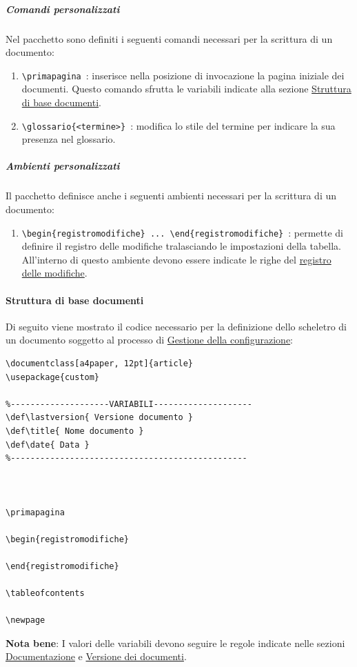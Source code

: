\subparagraph{Comandi personalizzati}
Nel pacchetto sono definiti i seguenti comandi necessari per la scrittura di un documento:
\begin{enumerate}
    \item \lstinline|\primapagina|\ : inserisce nella posizione di invocazione la pagina iniziale dei documenti.
    Questo comando sfrutta le variabili indicate alla sezione \hyperref[par:struttura_di_base_documenti]{Struttura di base documenti}.
    \item \lstinline|\glossario{<termine>}|\ : modifica lo stile del termine per indicare la sua presenza nel glossario.
    
\end{enumerate}

\subparagraph{Ambienti personalizzati}
Il pacchetto definisce anche i seguenti ambienti necessari per la scrittura di un documento:
\begin{enumerate}
    \item \lstinline|\begin{registromodifiche} ... \end{registromodifiche}|\ :
    permette di definire il registro delle modifiche tralasciando le impostazioni della tabella.
    All'interno di questo ambiente devono essere indicate le righe del \hyperref[par:registro_delle_modifiche]{registro delle modifiche}.
\end{enumerate}

\paragraph{Struttura di base documenti}
\label{par:struttura_di_base_documenti}
Di seguito viene mostrato il codice necessario per la definizione dello scheletro di un documento soggetto al processo di \hyperref[subsec:gestione_della_configurazione]{Gestione della configurazione}:

\begin{lstlisting}
\documentclass[a4paper, 12pt]{article}
\usepackage{custom}

%--------------------VARIABILI--------------------
\def\lastversion{ Versione documento }
\def\title{ Nome documento }
\def\date{ Data }
%------------------------------------------------



\primapagina

\begin{registromodifiche}

\end{registromodifiche}

\tableofcontents

\newpage

\end{lstlisting}
\textbf{Nota bene}: I valori delle variabili devono seguire le regole indicate nelle sezioni \hyperref[subsec:documentazione]{Documentazione} e \hyperref[par:versione_documenti]{Versione dei documenti}.

